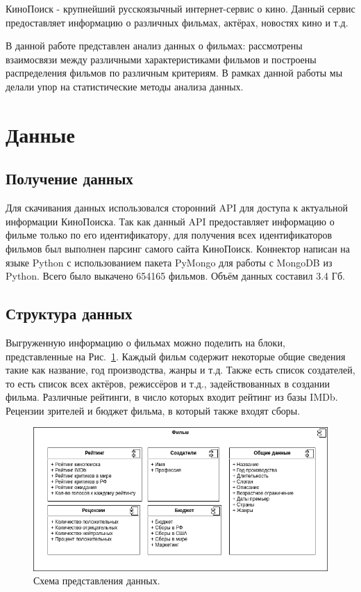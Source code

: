 \documentclass[conference]{IEEEtran}
\begin{document}
КиноПоиск - крупнейший русскоязычный интернет-сервис о кино. Данный сервис предоставляет информацию о различных фильмах, актёрах, новостях кино и т.д.

В данной работе представлен анализ данных о фильмах: рассмотрены взаимосвязи между 
различными характеристиками фильмов и построены распределения фильмов по различным критериям. В рамках данной работы мы делали упор на статистические методы анализа данных.

\section{Данные}

\subsection{Получение данных}

Для скачивания данных использовался сторонний API для доступа к актуальной информации КиноПоиска. Так как данный API предоставляет информацию о фильме только по его идентификатору, для получения всех идентификаторов фильмов был выполнен парсинг самого сайта КиноПоиск. Коннектор написан на языке Python с использованием пакета PyMongo для работы с MongoDB из Python. Всего было выкачено 654165 фильмов. Объём данных составил 3.4 Гб.

\subsection{Структура данных}

Выгруженную информацию о фильмах можно поделить на блоки, представленные на Рис.~\ref{fig:1}. Каждый фильм содержит некоторые общие сведения такие как название, год производства, жанры и т.д. Также есть список создателей, то есть список всех актёров, режиссёров и т.д., задействованных в создании фильма. Различные рейтинги, в число которых входит рейтинг из базы IMDb. Рецензии зрителей и бюджет фильма, в который также входят сборы.

\begin{figure}[ht!]
	\includegraphics[width=\linewidth]{../report/images/dataStructure}
	\caption{Схема представления данных.}
	\label{fig:1}
\end{figure}
\end{document}
